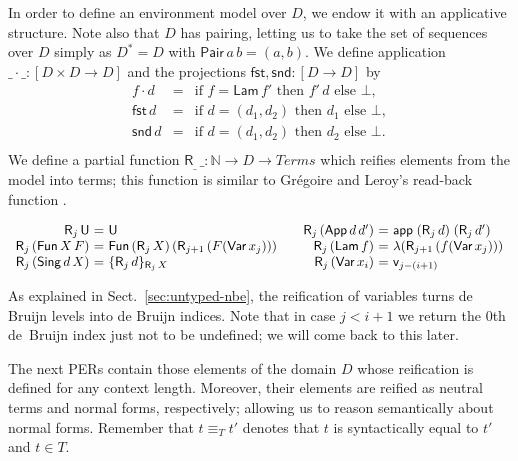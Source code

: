 \documentclass{LMCS}
\theoremstyle{plain}\newtheorem{satz}[thm]{Satz}
\newcommand{\tfst}{\mathsf{fst}}
\newcommand{\tsnd}{\mathsf{snd}}
\newcommand{\tPair}{\mathsf{Pair}}
\newcommand{\into}{\rightarrow}
\newcommand{\TmU}{\mathsf{U}}
\newcommand{\F}[2]{\mathsf{Fun}\,#1\,#2}
\newcommand{\appTm}[2]{\mathsf{app}\;#1\;#2} \newcommand{\singTm}[2]{\{#1\}_{#2}}
\newcommand{\ind}[1]{\mathsf{v}_{#1}}
\newcommand{\reify}[2]{\mathsf{R}_{#1}\,#2}
\newcommand{\iLam}[1]{\mathsf{Lam}\,#1}
\newcommand{\iNe}[2]{\mathsf{App}\,#1\,#2}
\newcommand{\iVar}[1]{\mathsf{Var}\,x_{#1}}
\newcommand{\iU}{\mathsf{U}}
\newcommand{\iPi}[2]{\mathsf{Fun}\,#1\,#2}
\newcommand{\iSing}[2]{\mathsf{Sing}\,#1\,{#2}}
\newcommand{\fst}{\tfst}\newcommand{\snd}{\tsnd}\newcommand{\appD}{\mathsf{appD}}
\newcommand{\terms}{\mathit{Terms}}
\begin{document}
In order to define an environment model over $D$, we endow it with an
applicative structure. Note also that $D$ has pairing, letting us to
take the set of sequences over $D$ simply as $D^* = D$ with
$\tPair\,a\,b = (a,b)$. We define application $\_\cdot\_ : [D \times D
\to D]$ and the projections $\fst,\snd : [D \to D]$ by
\[
\begin{array}{lll}
  f \cdot d & = & 
   \mbox{if } f = \iLam f' \mbox{ then } f'\,d \mbox{ else } \bot
,\\
  \fst\,d & = & 
   \mbox{if } d = (d_1,d_2) \mbox{ then } d_1 \mbox{ else } \bot
,\\
  \snd\,d & = & 
   \mbox{if } d = (d_1,d_2) \mbox{ then } d_2 \mbox{ else } \bot
.\\
\end{array}
\] 
We define a partial function $\reify{\_}{\_}: \mathbb{N} \into D \into
\terms$ which reifies elements from the model into terms; this
function is similar to Gr\'egoire and Leroy's read-back function
\cite{gregoireLeroy:compiledReduction}. 
\begin{defi}
  \label{def:reify}
\[
  \begin{array}[t]{r@{~}c@{~}l}
    \reify{j} {\iU}& = & \TmU \\
    \reify{j} {(\iPi{X}{F})} & = & \F{(\reify{j}{X}) }{(\reify{j+1}{(F(\iVar{j}))})} \\
    \reify{j} {(\iSing{d}{X})} & = &
    \singTm{\reify{j}{d}}{\reify{j}{X}} \\
  \end{array}
\quad
  \begin{array}[t]{r@{~}c@{~}l}
    \reify{j} {(\iNe{d}{d'})} & = &   \appTm{(\reify{j}{d})}{(\reify{j}{d'})}  \\
    \reify{j} {(\iLam{f})} & = & \lambda(\reify{j+1}{(f (\iVar{j}))}) \\
    \reify{j} {(\iVar{i})}& = & \ind{j - (i + 1)}
\end{array}
\]
\end{defi}

As explained in Sect.~\ref{sec:untyped-nbe}, the reification of
variables turns de Bruijn levels into de Bruijn indices. 
Note that in case $j < i + 1$ we
return the $0$th de~Bruijn index just not to be undefined;
we will come back to this later. 




The next PERs contain those elements of the domain $D$ whose
reification is defined for any context length. Moreover, their
elements are reified as neutral terms and normal forms, respectively;
allowing us to reason semantically about normal forms. Remember that
$t\equiv_T t'$ denotes that $t$ is syntactically equal to $t'$ and $t
\in T$.
\end{document}
